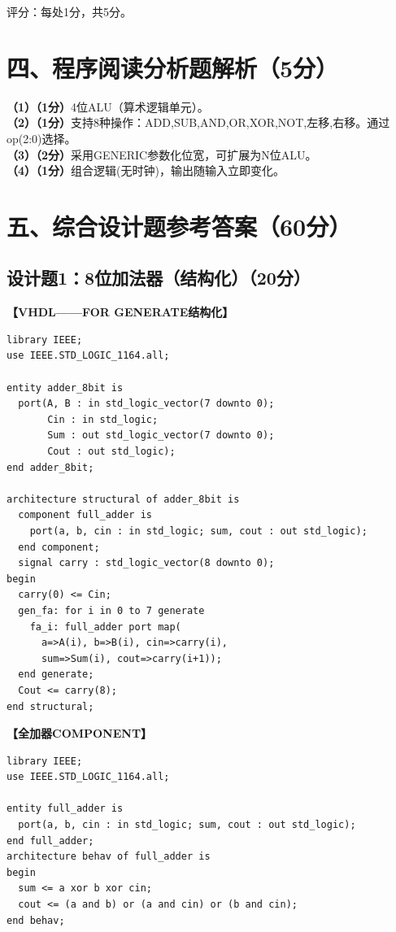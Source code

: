 {\centering 评分：每处1分，共5分。\par}

\section{四、程序阅读分析题解析（5分）}

\textbf{（1）（1分）}4位ALU（算术逻辑单元）。\\
\textbf{（2）（1分）}支持8种操作：ADD,SUB,AND,OR,XOR,NOT,左移,右移。通过op(2:0)选择。\\
\textbf{（3）（2分）}采用GENERIC参数化位宽，可扩展为N位ALU。\\
\textbf{（4）（1分）}组合逻辑(无时钟)，输出随输入立即变化。

\section{五、综合设计题参考答案（60分）}

\subsection{设计题1：8位加法器（结构化）（20分）}

\textbf{【VHDL——FOR GENERATE结构化】}
\begin{lstlisting}
library IEEE;
use IEEE.STD_LOGIC_1164.all;

entity adder_8bit is
  port(A, B : in std_logic_vector(7 downto 0);
       Cin : in std_logic;
       Sum : out std_logic_vector(7 downto 0);
       Cout : out std_logic);
end adder_8bit;

architecture structural of adder_8bit is
  component full_adder is
    port(a, b, cin : in std_logic; sum, cout : out std_logic);
  end component;
  signal carry : std_logic_vector(8 downto 0);
begin
  carry(0) <= Cin;
  gen_fa: for i in 0 to 7 generate
    fa_i: full_adder port map(
      a=>A(i), b=>B(i), cin=>carry(i),
      sum=>Sum(i), cout=>carry(i+1));
  end generate;
  Cout <= carry(8);
end structural;
\end{lstlisting}

\textbf{【全加器COMPONENT】}
\begin{lstlisting}
library IEEE;
use IEEE.STD_LOGIC_1164.all;

entity full_adder is
  port(a, b, cin : in std_logic; sum, cout : out std_logic);
end full_adder;
architecture behav of full_adder is
begin
  sum <= a xor b xor cin;
  cout <= (a and b) or (a and cin) or (b and cin);
end behav;
\end{lstlisting}

